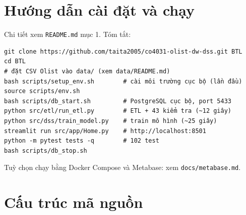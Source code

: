 \documentclass[12pt,a4paper]{report}
\newcommand{\code}[1]{\texttt{#1}}
\renewcommand{\_}{\oldunderscore\allowbreak}
\begin{document}
\appendix
\chapter{Hướng dẫn cài đặt và chạy}

Chi tiết xem \code{README.md} mục 1. Tóm tắt:

{\small
\begin{verbatim}
git clone https://github.com/taita2005/co4031-olist-dw-dss.git BTL
cd BTL
# đặt CSV Olist vào data/ (xem data/README.md)
bash scripts/setup_env.sh        # cài môi trường cục bộ (lần đầu)
source scripts/env.sh
bash scripts/db_start.sh         # PostgreSQL cục bộ, port 5433
python src/etl/run_etl.py        # ETL + 43 kiểm tra (~12 giây)
python src/dss/train_model.py    # train mô hình (~25 giây)
streamlit run src/app/Home.py    # http://localhost:8501
python -m pytest tests -q        # 102 test
bash scripts/db_stop.sh
\end{verbatim}
}

Tuỳ chọn chạy bằng Docker Compose và Metabase: xem \code{docs/metabase.md}.

\chapter{Cấu trúc mã nguồn}
\end{document}
